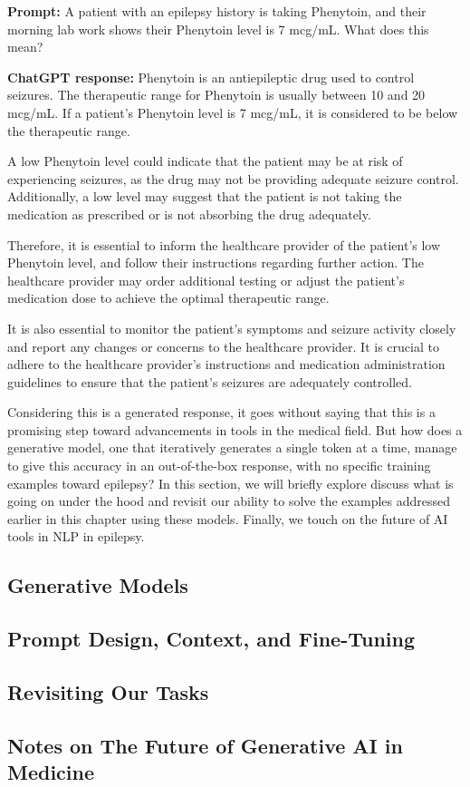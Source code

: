 \begin{displayquote}
  \textbf{Prompt:} A patient with an epilepsy history is taking Phenytoin, and their morning lab work shows their Phenytoin level is 7 mcg/mL. What does this mean?
\end{displayquote}

\begin{displayquote}
  \textbf{ChatGPT response:} Phenytoin is an antiepileptic drug used to control seizures. The therapeutic range for Phenytoin is usually between 10 and 20 mcg/mL. If a patient's Phenytoin level is 7 mcg/mL, it is considered to be below the therapeutic range.

  A low Phenytoin level could indicate that the patient may be at risk of experiencing seizures, as the drug may not be providing adequate seizure control. Additionally, a low level may suggest that the patient is not taking the medication as prescribed or is not absorbing the drug adequately.

  Therefore, it is essential to inform the healthcare provider of the patient's low Phenytoin level, and follow their instructions regarding further action. The healthcare provider may order additional testing or adjust the patient's medication dose to achieve the optimal therapeutic range.

  It is also essential to monitor the patient's symptoms and seizure activity closely and report any changes or concerns to the healthcare provider. It is crucial to adhere to the healthcare provider's instructions and medication administration guidelines to ensure that the patient's seizures are adequately controlled.
\end{displayquote}

Considering this is a generated response, it goes without saying that this is a promising step toward advancements in tools
in the medical field. But how does a generative model, one that iteratively generates a single token at a time, manage to give
this accuracy in an out-of-the-box response, with no specific training examples toward epilepsy? In this section, we will briefly explore
discuss what is going on under the hood and revisit our ability to solve the examples addressed earlier in this chapter using these
models. Finally, we touch on the future of AI tools in NLP in epilepsy.

\subsection{Generative Models}

\subsection{Prompt Design, Context, and Fine-Tuning}

\subsection{Revisiting Our Tasks}

\subsection{Notes on The Future of Generative AI in Medicine}
